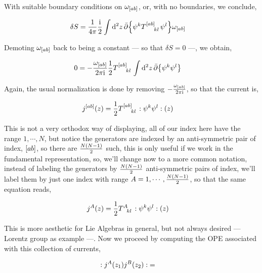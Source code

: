 With suitable boundary conditions on $\omega_{\qty[ab]}$, or, with no boundaries, we conclude,

\begin{align*}
    \delta S&=\frac{1}{4\pi}\frac\im 2\int\dd[2]{z}\bar\partial\qty{\psi^k\tensor{T}{^{\qty[ab]}_k_l}\psi^l}\omega_{\qty[ab]}
\end{align*}

Demoting $\omega_{\qty[ab]}$ back to being a constant --- so that $\delta S=0$ ---, we obtain,

\begin{align*}
    0&=-\frac{\omega_{\qty[ab]}}{2\pi\im}\frac1 2\tensor{T}{^{\qty[ab]}_k_l}\int\dd[2]{z}\bar\partial\qty{\psi^k\psi^l}
\end{align*}

Again, the usual normalization is done by removing $-\frac{\omega_{\qty[ab]}}{2\pi\textnormal{i}}$, so that the current is,

\begin{align*}
    j^{\qty[ab]}\qty(z)&=\frac1 2\tensor{T}{^{\qty[ab]}_k_l}\cnord{\psi^k\psi^l}\qty(z)
\end{align*}

This is not a very orthodox way of displaying, all of our index here have the range $1,\cdots, N$, but notice the generators are indexed by an 
anti-symmetric pair of index, $\qty[ab]$, so there are $\frac{N\qty(N-1)}{2}$ such, this is only useful if we work in the fundamental representation, 
so, we'll change now to a more common notation, instead of labeling the generators by $\frac{N\qty(N-1)}{2}$ anti-symmetric pairs of index, we'll 
label them by just one index with range $A=1,\cdots , \frac{N\qty(N-1)}{2}$, so that the same equation reads,

\begin{align*}
    j^A\qty(z)&=\frac1 2\tensor{T}{^A_k_l}\cnord{\psi^k\psi^l}\qty(z)
\end{align*}

This is more aesthetic for Lie Algebras in general, but not always desired --- Lorentz group as example ---. Now we proceed by computing the 
OPE associated with this collection of currents,

\begin{align*}
    :j^A\qty(z_1)j^B\qty(z_2):&=
\end{align*}

\probitem{}
\probitem{}